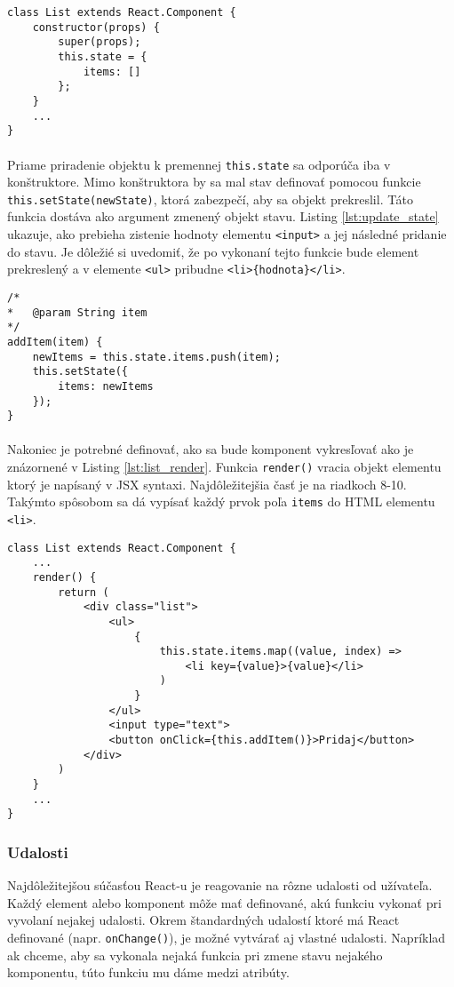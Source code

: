 \begin{lstlisting}[caption={Definovanie stavu v konštruktore komponentu},label={lst:init_state}]
class List extends React.Component {
	constructor(props) {
		super(props);
		this.state = {
			items: []
		};
	}
	...
}
\end{lstlisting}

\paragraph{}
Priame priradenie objektu k premennej \texttt{this.state} sa odporúča iba v konštruktore. Mimo konštruktora by sa mal stav definovať pomocou funkcie \texttt{this.setState(newState)}, ktorá zabezpečí, aby sa objekt prekreslil. Táto funkcia dostáva ako argument zmenený objekt stavu. Listing \ref{lst:update_state} ukazuje, ako prebieha zistenie hodnoty elementu \texttt{<input>} a jej následné pridanie do stavu. Je dôležié si uvedomiť, že po vykonaní tejto funkcie bude element prekreslený a v elemente \texttt{<ul>} pribudne \texttt{<li>\{hodnota\}</li>}.

\begin{lstlisting}[caption={Zmena stavu komponentu pomocou funkcie \texttt{this.setState()}},label={lst:update_state}]
/*
*	@param String item
*/
addItem(item) {
	newItems = this.state.items.push(item);
	this.setState({
		items: newItems
	});
}
\end{lstlisting}
\paragraph{}
Nakoniec je potrebné definovať, ako sa bude komponent vykresľovať ako je znázornené v Listing \ref{lst:list_render}. Funkcia \texttt{render()} vracia objekt elementu ktorý je napísaný v JSX syntaxi. Najdôležitejšia časť je na riadkoch 8-10. Takýmto spôsobom sa dá vypísať každý prvok poľa \texttt{items} do HTML elementu \texttt{<li>}.
\begin{lstlisting}[caption={Vykresľovanie komponentu \texttt{List}},label={lst:list_render}]
class List extends React.Component {
	...
	render() {
		return (
			<div class="list">
				<ul>
					{
						this.state.items.map((value, index) => 
							<li key={value}>{value}</li>					
						)				
					}
				</ul>
				<input type="text">
				<button onClick={this.addItem()}>Pridaj</button>
			</div>	
		)
	}
	...
} 
\end{lstlisting}

\subsubsection{Udalosti}
Najdôležitejšou súčasťou React-u je reagovanie na rôzne udalosti od užívateľa. Každý element alebo komponent môže mať definované, akú funkciu vykonať pri vyvolaní nejakej udalosti. Okrem štandardných udalostí ktoré má React definované (napr. \texttt{onChange()}), je možné vytvárať aj vlastné udalosti. Napríklad ak chceme, aby sa vykonala nejaká funkcia pri zmene stavu nejakého komponentu, túto funkciu mu dáme medzi atribúty.
